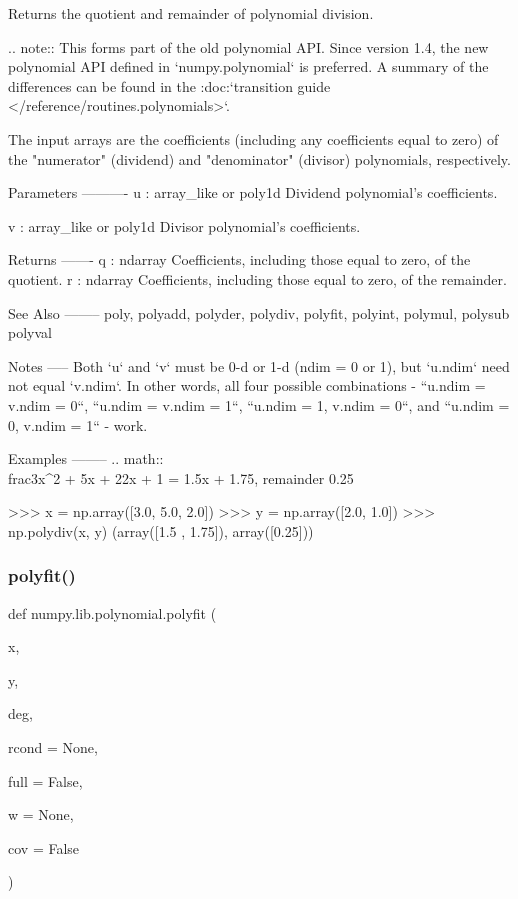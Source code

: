 \begin{DoxyVerb}Returns the quotient and remainder of polynomial division.

.. note::
   This forms part of the old polynomial API. Since version 1.4, the
   new polynomial API defined in `numpy.polynomial` is preferred.
   A summary of the differences can be found in the
   :doc:`transition guide </reference/routines.polynomials>`.

The input arrays are the coefficients (including any coefficients
equal to zero) of the "numerator" (dividend) and "denominator"
(divisor) polynomials, respectively.

Parameters
----------
u : array_like or poly1d
    Dividend polynomial's coefficients.

v : array_like or poly1d
    Divisor polynomial's coefficients.

Returns
-------
q : ndarray
    Coefficients, including those equal to zero, of the quotient.
r : ndarray
    Coefficients, including those equal to zero, of the remainder.

See Also
--------
poly, polyadd, polyder, polydiv, polyfit, polyint, polymul, polysub
polyval

Notes
-----
Both `u` and `v` must be 0-d or 1-d (ndim = 0 or 1), but `u.ndim` need
not equal `v.ndim`. In other words, all four possible combinations -
``u.ndim = v.ndim = 0``, ``u.ndim = v.ndim = 1``,
``u.ndim = 1, v.ndim = 0``, and ``u.ndim = 0, v.ndim = 1`` - work.

Examples
--------
.. math:: \\frac{3x^2 + 5x + 2}{2x + 1} = 1.5x + 1.75, remainder 0.25

>>> x = np.array([3.0, 5.0, 2.0])
>>> y = np.array([2.0, 1.0])
>>> np.polydiv(x, y)
(array([1.5 , 1.75]), array([0.25]))\end{DoxyVerb}
 \mbox{\label{namespacenumpy_1_1lib_1_1polynomial_a3b001aa881bfc281be7086b33c703933}} 
\subsubsection{\texorpdfstring{polyfit()}{polyfit()}}
{\footnotesize\ttfamily def numpy.\+lib.\+polynomial.\+polyfit (\begin{DoxyParamCaption}\item[{}]{x,  }\item[{}]{y,  }\item[{}]{deg,  }\item[{}]{rcond = {\ttfamily None},  }\item[{}]{full = {\ttfamily False},  }\item[{}]{w = {\ttfamily None},  }\item[{}]{cov = {\ttfamily False} }\end{DoxyParamCaption})}

